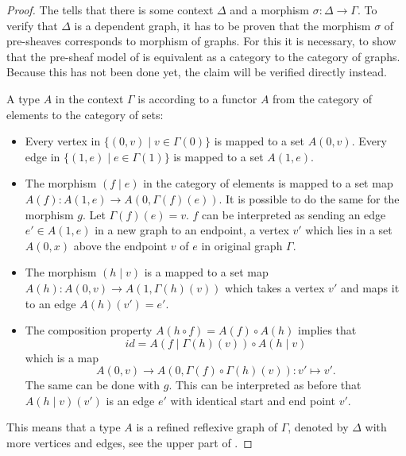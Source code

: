 \documentclass[12pt,a4paper,twoside,xetex]{book} %
\begin{document}
\begin{proof} 

The  tells that there is some context $\Delta$ and a morphism $\sigma : \Delta \rightarrow \Gamma$. To verify that $\Delta$ is a dependent graph, it has to be proven that the morphism $\sigma$ of pre-sheaves corresponds to morphism of graphs. For this it is necessary, to show that the pre-sheaf model of  is equivalent as a category to the category of graphs. Because this has not been done yet, the claim will be verified directly instead. 

A type $A$ in the context $\Gamma$ is according to  a functor $A$ from the category of elements to the category of sets:

\begin{itemize}
\item Every vertex in $\{ (0, v) \mid v \in \Gamma (0) \}$ is mapped to a set 
$A(0,v)$. Every edge in $\{ (1, e) \mid e \in \Gamma (1) \}$ is mapped to a set 
$A(1,e)$.

\item The morphism $(f \mid e)$ in the category of elements is mapped to a set 
map $A(f): A(1,e) \rightarrow A(0, \Gamma (f) (e))$.  It is possible to do the 
same for the morphism $g$. Let $\Gamma (f) (e) =v$. $f$ can be interpreted as 
sending an edge $e' \in A(1,e)$ in a new graph to an endpoint, a vertex $v'$ 
which lies in a set $A(0, x)$ above the endpoint $v$ of $e$ in original graph 
$\Gamma$.
 
\item The morphism $(h \mid v)$ is a mapped to a set map $A(h) : A(0,v) 
\rightarrow A(1, \Gamma (h) (v) )$ which takes a vertex $v'$ and maps it to an 
edge $A(h)(v')=e'$.

\item The composition property $A(h \circ f) = A(f) \circ A(h)$ implies that 
$$id = A \left( f \mid \Gamma (h) (v) \right) \circ A \left( h \mid v \right)$$ 
which is a map $$A(0,v) \rightarrow A(0, \Gamma (f) \circ \Gamma (h) (v)): v' 
\mapsto v'.$$ The same can be done with $g$. This can be interpreted as before 
that $A(h \mid v)(v')$ is an edge $e'$ with identical start and end point $v'$.
\end{itemize}

This means that a type $A$ is a refined reflexive graph of $\Gamma$, denoted by $\Delta$ with more 
vertices and edges, see the upper part of .



\end{proof}
\end{document}
